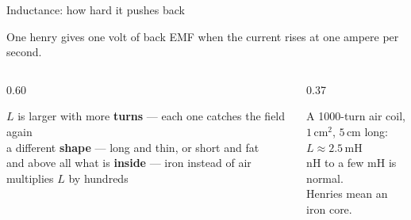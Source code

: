 \documentclass[11pt,aspectratio=169]{beamer}
\newcommand{\Icol}[1]{\textcolor{ccur}{#1}}
\newcommand{\Vcol}[1]{\textcolor{cvolt}{#1}}
\newcommand{\uni}[1]{\,\mathrm{#1}}
\begin{document}
\begin{frame}{Inductance: how hard it pushes back}
  \vfill
  \begin{center}
  \end{center}
  \vfill
  \begin{center}
    One henry gives one volt of back EMF when the current rises at one ampere per second.
  \end{center}
  \vfill
  \begin{columns}[T,onlytextwidth]
    \begin{column}{0.60\textwidth}
      \begin{block}{$L$ is larger with}
        \small
        more \textbf{turns} --- each one catches the field again\\
        a different \textbf{shape} --- long and thin, or short and fat\\
        and above all what is \textbf{inside} --- iron instead of air multiplies $L$ by
        hundreds
      \end{block}
    \end{column}
    \begin{column}{0.37\textwidth}
      \begin{center}
        {\large A 1000-turn air coil,\\ $1\uni{cm}^2$, $5\uni{cm}$ long:}\\[6pt]
        {\Large\color{metured} $L \approx 2.5\uni{mH}$}\\[6pt]
        {\small nH to a few mH is normal.\\ Henries mean an iron core.}
      \end{center}
    \end{column}
  \end{columns}
  \vfill
\end{frame}
\end{document}
